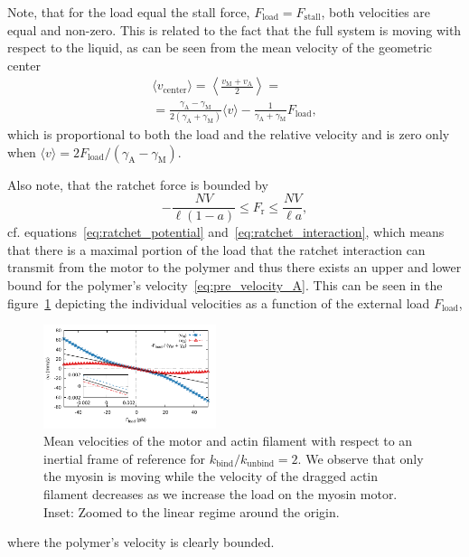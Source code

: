 \documentclass[aps,pre,twocolumn,showpacs,showkeys,superscriptaddress,floatfix]{revtex4-1}
\begin{document}
Note, that for the load equal the stall force, $F_\text{load} = F_\text{stall}$, both velocities are equal and non-zero.
This is related to the fact that the full system is moving with respect to the liquid, as can be seen from the mean velocity of the geometric center 
\begin{multline*}
\langle v_\text{center} \rangle = \left\langle \frac{ v_\text{M} + v_\text{A} }{2} \right\rangle 
= \\
= \frac{ \gamma_\text{A} - \gamma_\text{M} }{ 2 ( \gamma_\text{A} + \gamma_\text{M} ) } \langle v \rangle - \frac{1}{ \gamma_\text{A} + \gamma_\text{M} } F_\text{load}
, 
\end{multline*}
which is proportional to both the load and the relative velocity and is zero only when $\langle v \rangle = 2 F_\text{load} / ( \gamma_\text{A} - \gamma_\text{M} )$.

Also note, that the ratchet force is bounded by 
\[
- \frac{ N V }{ \ell (1-a) } 
\le 
F_\text{r}
\le
\frac{ N V }{ \ell a } ,
\]
cf. equations~\eqref{eq:ratchet_potential} and~\eqref{eq:ratchet_interaction}, 
which means that there is a maximal portion of the load that the ratchet interaction can transmit from the motor to the polymer 
and thus there exists an upper and lower bound for the polymer's velocity~\eqref{eq:pre_velocity_A}.   
This can be seen in the figure~\ref{fig:ind_v} depicting the individual velocities as a function of the external load $F_\text{load}$,  
\begin{figure}[t]
\centering
\includegraphics[width=0.45\textwidth,height=!]{individual_velocities}
\caption{
\label{fig:ind_v} 
Mean velocities of the motor and actin filament with respect to an inertial frame of reference for $k_\text{bind}/k_\text{unbind} = 2$.
We observe that only the myosin is moving while the velocity of the dragged actin filament decreases as we increase the load on the myosin motor.
Inset: Zoomed to the linear regime around the origin.
}
\end{figure}
where the polymer's velocity is clearly bounded. 
\end{document}
